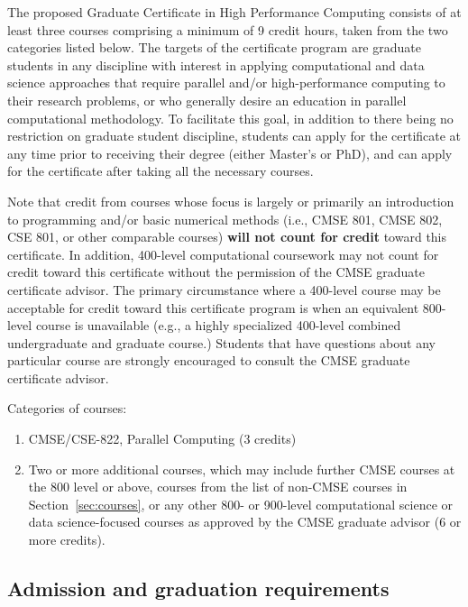 The proposed Graduate Certificate in High Performance Computing
consists of at least three courses comprising a minimum of 9 credit
hours, taken from the two categories listed below. The targets of the
certificate program are graduate students in any discipline with
interest in applying computational and data science approaches that
require parallel and/or high-performance computing to their research
problems, or who generally desire an education in parallel
computational methodology. To facilitate this goal, in addition to
there being no restriction on graduate student discipline, students
can apply for the certificate at any time prior to receiving their
degree (either Master’s or PhD), and can apply for the certificate
after taking all the necessary courses.

Note that credit from courses whose focus is largely or primarily an
introduction to programming and/or basic numerical methods (i.e., CMSE
801, CMSE 802, CSE 801, or other comparable courses) \textbf{will not count
for credit} toward this certificate. In addition, 400-level
computational coursework may not count for credit toward this
certificate without the permission of the CMSE graduate certificate
advisor. The primary circumstance where a 400-level course may be
acceptable for credit toward this certificate program is when an
equivalent 800-level course is unavailable (e.g., a highly specialized
400-level combined undergraduate and graduate course.) Students that
have questions about any particular course are strongly encouraged to
consult the CMSE graduate certificate advisor.

Categories of courses:

\begin{enumerate}

\item CMSE/CSE-822, Parallel Computing (3 credits)  

\item Two or more additional courses, which may include further CMSE
  courses at the 800 level or above, courses from the list of non-CMSE
  courses in Section~\ref{sec:courses}, or any other 800-
  or 900-level computational science or data science-focused courses
  as approved by the CMSE graduate advisor (6 or more credits).

\end{enumerate}

\subsection{Admission and graduation requirements}

